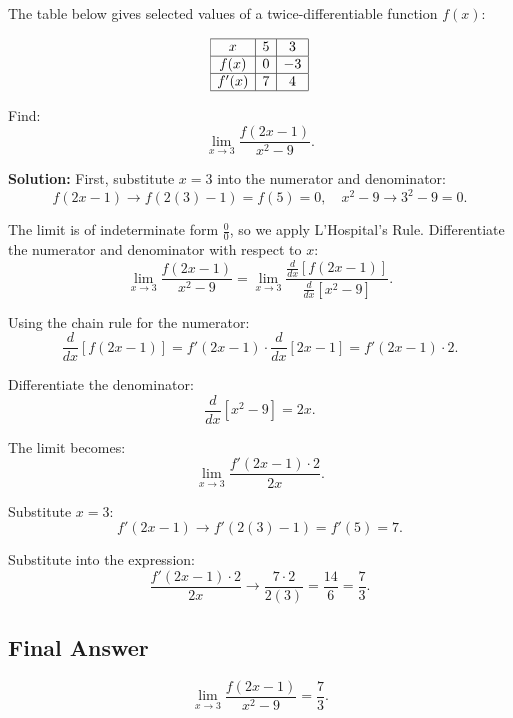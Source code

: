 \documentclass[12pt]{article}
\theoremstyle{beautifulthm}
\begin{document}
\begin{tcolorbox}[colback=examplebg, colframe=red!75!black, title=\textbf{EXAMPLE 3: Using L'hospital to find the Limit}, fonttitle=\bfseries, sharp corners]

The table below gives selected values of a twice-differentiable function \( f(x) \):

\[
\begin{array}{|c|c|c|}
\hline
x & 5 & 3 \\ \hline
f(x) & 0 & -3 \\ \hline
f'(x) & 7 & 4 \\ \hline
\end{array}
\]

Find:
\[
\lim_{x \to 3} \frac{f(2x - 1)}{x^2 - 9}.
\]


\tcblower
\textbf{Solution:} 
First, substitute \( x = 3 \) into the numerator and denominator:
\[
f(2x - 1) \to f(2(3) - 1) = f(5) = 0, \quad x^2 - 9 \to 3^2 - 9 = 0.
\]

The limit is of indeterminate form \( \frac{0}{0} \), so we apply L'Hospital's Rule. Differentiate the numerator and denominator with respect to \( x \):
\[
\lim_{x \to 3} \frac{f(2x - 1)}{x^2 - 9} = \lim_{x \to 3} \frac{\frac{d}{dx}[f(2x - 1)]}{\frac{d}{dx}[x^2 - 9]}.
\]

Using the chain rule for the numerator:
\[
\frac{d}{dx}[f(2x - 1)] = f'(2x - 1) \cdot \frac{d}{dx}[2x - 1] = f'(2x - 1) \cdot 2.
\]

Differentiate the denominator:
\[
\frac{d}{dx}[x^2 - 9] = 2x.
\]

The limit becomes:
\[
\lim_{x \to 3} \frac{f'(2x - 1) \cdot 2}{2x}.
\]

Substitute \( x = 3 \):
\[
f'(2x - 1) \to f'(2(3) - 1) = f'(5) = 7.
\]

Substitute into the expression:
\[
\frac{f'(2x - 1) \cdot 2}{2x} \to \frac{7 \cdot 2}{2(3)} = \frac{14}{6} = \frac{7}{3}.
\]

\subsection*{Final Answer}
\[
\lim_{x \to 3} \frac{f(2x - 1)}{x^2 - 9} = \frac{7}{3}.
\]

\end{tcolorbox}
\end{document}

